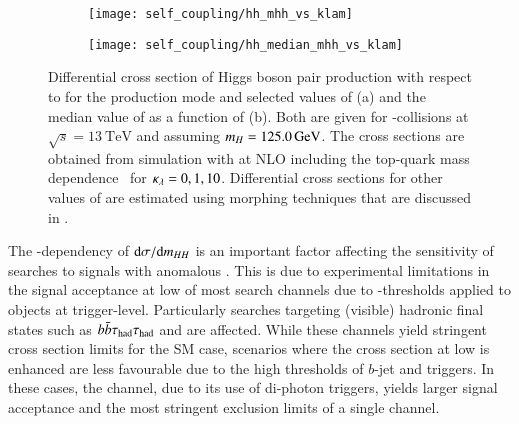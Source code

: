 \begin{figure}[htbp]
  \begin{subfigure}[t]{0.485\textwidth}
    \texttt{[image: self\_coupling/hh\_mhh\_vs\_klam]}
    \subcaption{%
    }%
    \label{fig:hh_xsec_mhh}
  \end{subfigure}\hfill%
  \begin{subfigure}[t]{0.485\textwidth}
    \texttt{[image: self\_coupling/hh\_median\_mhh\_vs\_klam]}
    \subcaption{%
    }%
    \label{fig:hh_median_mhh}
  \end{subfigure}

  \caption{Differential cross section of Higgs boson pair production
    with respect to \mHH for the \ggF production mode and selected
    values of \klambda (a) and the median value of \mHH as a function
    of \klambda (b). Both are given for \pp-collisions at
    $\sqrt{s} = \SI{13}{\TeV}$ and assuming $m_{H} =
    \SI{125.0}{\ensuremath{\text{GeV}}}$. The cross sections are obtained from simulation
    with \POWHEGBOX[v2] at NLO including the top-quark mass
    dependence~\cite{Heinrich:2019bkc,Heinrich:2020ckp} for
    $\kappa_{\lambda} = 0, 1, 10$. Differential cross sections for other
    values of \klambda are estimated using morphing techniques that
    are discussed in .}
  \label{fig:xsec_median_mhh}
\end{figure}

The \klambda-dependency of $\mathrm{d}\sigma / \mathrm{d}m_{HH}$ is an
important factor affecting the sensitivity of searches to signals with
anomalous \klambda. This is due to experimental limitations in the
signal acceptance at low \mHH of most search channels due to
\pT-thresholds applied to objects at trigger-level. Particularly
searches targeting (visible) hadronic final states such as
$b\bar{b}\tau_{\text{had}}\tau_{\text{had}}$ and \bbbb are affected. While these channels yield
stringent cross section limits for the SM case, scenarios where the
cross section at low \mHH is enhanced are less favourable due to the
high thresholds of $b$-jet and \tauhadvis triggers. In these cases,
the \bbyy channel, due to its use of di-photon triggers, yields larger
signal acceptance and the most stringent exclusion limits of a single
channel.


